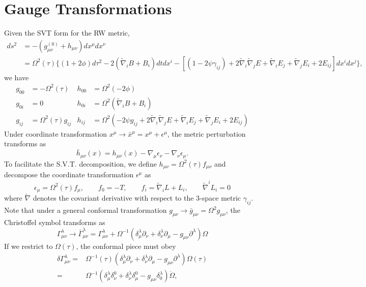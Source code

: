 \documentclass[10pt,letterpaper]{article}
\numberwithin{equation}{subsection}
\begin{document}
\section{Gauge Transformations}
Given the SVT form for the RW metric,
\begin{align}
	ds^2 &= -(g_{\mu\nu}^{(0)}+h_{\mu\nu})dx^\mu dx^\nu \nonumber \\
	&= \Omega^2(\tau)\{(1+2\phi)d\tau^2 - 2(\tilde\nabla_i B + B_i)dtdx^i -[(1-2\psi \gamma_{ij})+2\tilde\nabla_i\tilde \nabla_j E + \tilde\nabla _i E_j +\tilde \nabla_j E_i + 2E_{ij}]dx^idx^j\},
\end{align}
we have
\begin{align}
	g_{00} &=-\Omega^2(\tau) 	&h_{00} &=\Omega^2( -2\phi)\\
	 g_{0i} &=0  &h_{0i} &= \Omega^2(\tilde\nabla_i B + B_i)\\
	 g_{ij} &=\Omega^2(\tau) g_{ij}  &h_{ij} &= \Omega^2(-2\psi g_{ij} + 
	2\tilde\nabla_i\tilde\nabla_j E + \tilde\nabla _i E_j + \tilde\nabla_j E_i + 2E_{ij})
	\end{align}
Under coordinate transformation $x^\mu \to \bar x^\mu = x^\mu + \epsilon^\mu$, the metric perturbation transforms as
\begin{equation}
	\bar h_{\mu\nu}(x) = h_{\mu\nu}(x) - \nabla_\mu \epsilon_\nu - \nabla_\nu \epsilon_\mu.
\end{equation}
To facilitate the S.V.T. decomposition, we define $h_{\mu\nu} = \Omega^2(\tau) f_{\mu\nu}$ and decompose the coordinate transformation $\epsilon^\mu$ as
\[
	\epsilon_\mu = \Omega^2(\tau) f_\mu,\qquad f_0 = -T,\qquad f_i =\tilde \nabla_i L + L_i,\qquad \tilde \nabla^i L_i = 0
\]
where $\tilde\nabla$ denotes the covariant derivative with respect to the 3-space metric $\gamma_{ij}$. Note that
under a general conformal transformation $g_{\mu\nu} \to \bar g_{\mu\nu} = \Omega^2 g_{\mu\nu}$,
the Christoffel symbol transforms as
\begin{equation}
\Gamma^\lambda_{\mu\nu} \to \bar \Gamma^\lambda_{\mu\nu} 
= \Gamma^\lambda_{\mu\nu}  + \Omega^{-1}(\delta^\lambda_\mu \partial_\nu +\delta^\lambda_\nu \partial_\mu - g_{\mu\nu} \partial^\lambda )\Omega
\end{equation}
If we restrict to $\Omega(\tau)$, the conformal piece must obey
\begin{align}
\delta \Gamma^\lambda_{\mu\nu} ={}& \Omega^{-1}(\tau)(\delta^\lambda_\mu \partial_\nu +\delta^\lambda_\nu \partial_\mu - g_{\mu\nu} \partial^\lambda )\Omega(\tau)
\nonumber\\
={}& \Omega^{-1}( \delta^\lambda_\mu \delta^0_\nu +\delta^\lambda_\nu \delta^0_\mu - g_{\mu\nu} \delta^\lambda_0)\dot\Omega,
\end{align}
\end{document}
